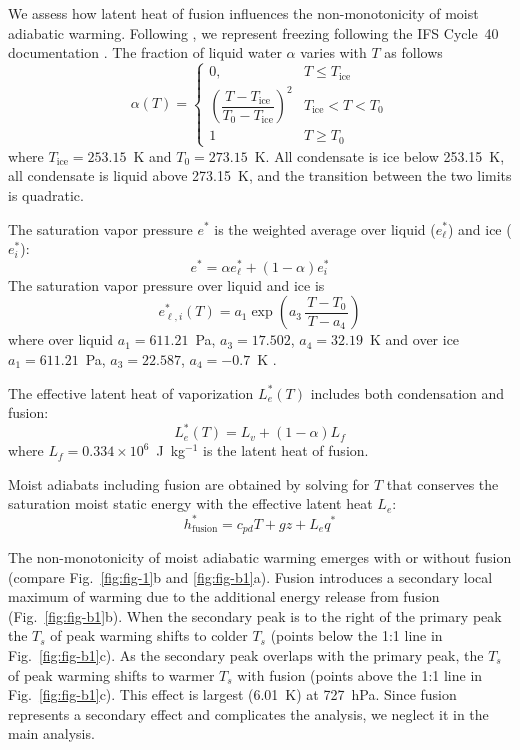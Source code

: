 \documentclass[draft,twocol]{ametsocV6.1}
\begin{document}
\appendix[B] 
\label{app:fusion}
We assess how latent heat of fusion influences the non-monotonicity of moist adiabatic warming. Following \cite{flannaghan2014}, we represent freezing following the IFS Cycle~40 documentation \citep{ecmwf2022}. The fraction of liquid water $\alpha$ varies with $T$ as follows
\begin{equation}
\alpha(T)=
\begin{cases}
0, & T \le T_{\mathrm{ice}} \\
\left(\dfrac{T-T_{\mathrm{ice}}}{T_0-T_{\mathrm{ice}}}\right)^2 & T_{\mathrm{ice}}<T<T_0 \\
1 & T \ge T_0
\end{cases}
\end{equation}
where $T_{\mathrm{ice}}=253.15$~K and $T_0=273.15$~K. All condensate is ice below 253.15~K, all condensate is liquid above 273.15~K, and the transition between the two limits is quadratic.

The saturation vapor pressure $e^*$ is the weighted average over liquid ($e_\ell^*$) and ice ($e_i^*$):
\begin{equation}
e^*=\alpha e_{\ell}^*+(1-\alpha)e_i^*
\end{equation}
The saturation vapor pressure over liquid and ice is
\begin{equation}
e_{\ell,i}^*(T) = a_1 \exp \left( a_3 \,\frac{T - T_0}{\,T - a_4\,} \right)
\label{eq:es_general}
\end{equation}
where over liquid $a_1=611.21$~Pa, $a_3=17.502$, $a_4=32.19$~K \citep{buck1981} and over ice $a_1=611.21$~Pa, $a_3=22.587$, $a_4=-0.7$~K \citep{alduchov1996}.

The effective latent heat of vaporization $L_e^*(T)$ includes both condensation and fusion:
\begin{equation}
L_e^*(T) = L_v + (1-\alpha) L_f
\end{equation}
where $L_f = 0.334 \times 10^6$~J~kg$^{-1}$ is the latent heat of fusion.

Moist adiabats including fusion are obtained by solving for $T$ that conserves the saturation moist static energy with the effective latent heat $L_e$:
\begin{equation}
    h_\mathrm{fusion}^* = c_{pd}T + gz + L_e q^*  \label{eq:mse_fusion}
\end{equation}

The non-monotonicity of moist adiabatic warming emerges with or without fusion (compare Fig.~\ref{fig:fig-1}b and \ref{fig:fig-b1}a). Fusion introduces a secondary local maximum of warming due to the additional energy release from fusion (Fig.~\ref{fig:fig-b1}b). When the secondary peak is to the right of the primary peak the $T_s$ of peak warming shifts to colder $T_s$ (points below the 1:1 line in Fig.~\ref{fig:fig-b1}c). As the secondary peak overlaps with the primary peak, the $T_s$ of peak warming shifts to warmer $T_s$ with fusion (points above the 1:1 line in Fig.~\ref{fig:fig-b1}c). This effect is largest (6.01~K) at 727~hPa. Since fusion represents a secondary effect and complicates the analysis, we neglect it in the main analysis.
\end{document}
